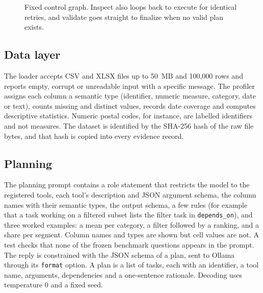 \begin{figure}[t]
\centering
{}
\caption{Fixed control graph. Inspect also loops back to execute for identical retries, and validate goes straight to finalize when no valid plan exists.}
\label{fig:graph}
\end{figure}

\subsection{Data layer}
The loader accepts CSV and XLSX files up to 50~MB and 100{,}000 rows and reports empty, corrupt or unreadable input with a specific message. The profiler assigns each column a semantic type (identifier, numeric measure, category, date or text), counts missing and distinct values, records date coverage and computes descriptive statistics. Numeric postal codes, for instance, are labelled identifiers and not measures. The dataset is identified by the SHA-256 hash of the raw file bytes, and that hash is copied into every evidence record.

\subsection{Planning}
The planning prompt contains a role statement that restricts the model to the registered tools, each tool's description and JSON argument schema, the column names with their semantic types, the output schema, a few rules (for example that a task working on a filtered subset lists the filter task in \texttt{depends\_on}), and three worked examples: a mean per category, a filter followed by a ranking, and a share per segment. Column names and types are shown but cell values are not. A test checks that none of the frozen benchmark questions appears in the prompt. The reply is constrained with the JSON schema of a plan, sent to Ollama~\cite{ollama} through its \texttt{format} option. A plan is a list of tasks, each with an identifier, a tool name, arguments, dependencies and a one-sentence rationale. Decoding uses temperature 0 and a fixed seed.

